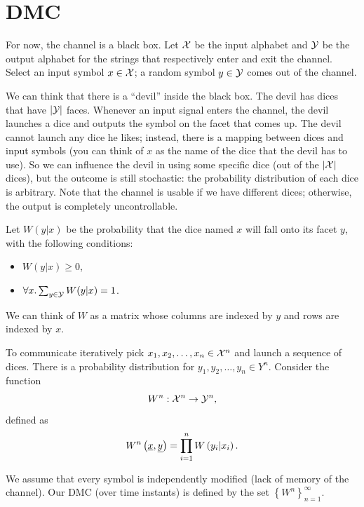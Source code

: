 
\section{\acl{DMC}}

For now, the channel is a black box.
Let $\mathcal{X}$ be the input alphabet and $\mathcal{Y}$ be the output alphabet for the strings that respectively enter and exit the channel.
Select an input symbol $x \in \mathcal{X}$; a random symbol $y \in \mathcal{Y}$ comes out of the channel.

We can think that there is a ``devil'' inside the black box.
The devil has dices that have $\left|{\mathcal{Y}}\right|$ faces.
Whenever an input signal enters the channel, the devil launches a dice and outputs the symbol on the facet that comes up.
The devil cannot launch any dice he likes; instead, there is a mapping between dices and input symbols (you can think of $x$ as the name of the dice that the devil has to use).
So we can influence the devil in using some specific dice (out of the $\left|{\mathcal{X}}\right|$ dices), but the outcome is still stochastic: the probability distribution of each dice is arbitrary.
Note that the channel is usable if we have different dices; otherwise, the output is completely uncontrollable.

Let $W(y|x)$ be the probability that the dice named $x$ will fall onto its facet $y$, with the following conditions: 
\begin{itemize}
	\item $W(y|x) \ge 0$,
	\item $\forall x . \sum_{y \in \mathcal{Y}} W(y|x) = 1$.
\end{itemize}
We can think of $W$ as a matrix whose columns are indexed by $y$ and rows are indexed by $x$.

To communicate iteratively pick $x_1, x_2, \dots, x_n \in \mathcal{X}^n$ and launch a sequence of dices.
There is a probability distribution for $y_1, y_2, \dots, y_n \in Y^n$. Consider the function
\begin{equation*}
	W^n : \mathcal{X}^n \to \mathcal{Y}^n,
\end{equation*}
defined as
\begin{equation*}
	W^n \left( \underline{x}, \underline{y} \right)
	= \prod_{i = 1}^n W \left( y_i | x_i \right).
\end{equation*}

We assume that every symbol is independently modified (lack of memory of the channel).
Our \ac{DMC} (over time instants) is defined by the set $\left\{ W^n \right\}_{n = 1}^{\infty}$.

